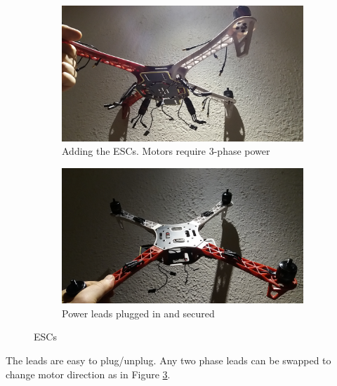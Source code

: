 \begin{figure}[H]
\begin{subfigure}{0.5\textwidth}
\centering
\includegraphics[scale=0.1]{images/drone-build-esc-3phaseunconnected.jpg}
\caption{Adding the ESCs. Motors require 3-phase power}
\label{fig:ESCs_uplugged}
\end{subfigure}
\begin{subfigure}{0.5\textwidth}
\centering
\includegraphics[scale=0.1]{images/drone-build-esc-3phaseconnected.jpg}
\caption{Power leads plugged in and secured}
\label{fig:ESCs_plugged}
\end{subfigure}
\caption{ESCs}
\label{fig:ESC}
\end{figure}

The leads are easy to plug/unplug. Any two phase leads can be swapped to change motor direction as in Figure \ref{fig:ESC}.\\

